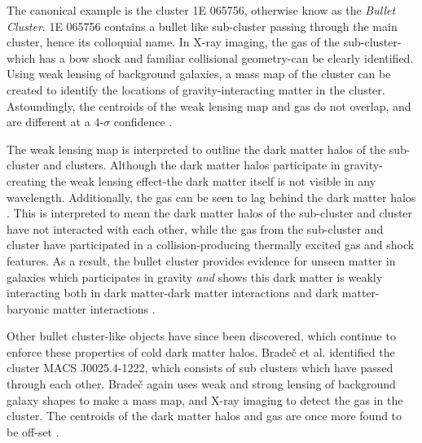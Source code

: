 \documentclass[12pt]{article}
\begin{document}
The canonical example is the cluster 1E 065756, otherwise know as the \emph{Bullet Cluster}. 1E 065756 contains a bullet like sub-cluster passing through the main cluster, hence its colloquial name. In X-ray imaging, the gas of the sub-cluster-which has a bow shock and familiar collisional geometry-can be clearly identified. Using weak lensing of background galaxies, a mass map of the cluster can be created to identify the locations of gravity-interacting matter in the cluster. Astoundingly, the centroids of the weak lensing map and gas do not overlap, and are different at a 4-$\sigma$ confidence \cite{Clowe2004}. 

The weak lensing map is interpreted to outline the dark matter halos of the sub-cluster and clusters. Although the dark matter halos participate in gravity-creating the weak lensing effect-the dark matter itself is not visible in any wavelength. Additionally, the gas can be seen to lag behind the dark matter halos \cite{Clowe2004}. This is interpreted to mean the dark matter halos of the sub-cluster and cluster have not interacted with each other,  while the gas from the sub-cluster and cluster have participated in a collision-producing thermally excited gas and shock features. As a result, the bullet cluster provides evidence for unseen matter in galaxies which participates in gravity \emph{and} shows this dark matter is weakly interacting both in dark matter-dark matter interactions and dark matter-baryonic matter interactions \cite{Furlanetto2002}.

Other bullet cluster-like objects have since been discovered, which continue to enforce these properties of cold dark matter halos. Brade\v{c} et al. identified the cluster MACS J0025.4-1222, which consists of sub clusters which have passed through each other. Brade\v{c} again uses weak and strong lensing of background galaxy shapes to make a mass map, and X-ray imaging to detect the gas in the cluster. The centroids of the dark matter halos and gas are once more found to be off-set \cite{Bradec2008}.
\end{document}
